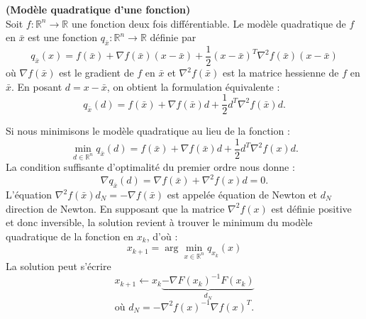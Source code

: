 \begin{frdefinition}\textbf {(Mod\`ele quadratique d'une fonction)} \\
Soit $f:\mathbb{R}^n\rightarrow \mathbb{R}$ une fonction deux fois diff\'erentiable. Le mod\`ele quadratique de $f$ en
$\bar{x}$ est une fonction $q_{\bar{x}}:\mathbb{R}^n\rightarrow \mathbb{R}$ d\'efinie par
$$q_{\bar{x}}(x)=f(\bar{x})+\nabla f(\bar{x})(x-\bar{x})+\frac{1}{2}(x-\bar{x})^T\nabla^2 f(\bar{x})(x-\bar{x})$$
o\`u $\nabla f(\bar{x})$ est le gradient de $f$ en $\bar{x}$ et $\nabla^2 f(\bar{x})$ est la matrice hessienne de
$f$ en $\bar{x}$. En posant $d=x-\bar{x}$, on obtient la formulation \'equivalente :
\begin{equation*}
q_{\bar{x}}(d)=f(\bar{x})+\nabla f(\bar{x})d+\frac{1}{2}d^T\nabla^2 f(\bar{x})d.
\end{equation*}
\end{frdefinition}
Si nous minimisons le mod\`ele quadratique au lieu de la fonction :
\begin{equation*}
\min_{d\in \mathbb{R}^n} q_{\bar{x}}(d)=f(\bar{x})+\nabla f(\bar{x})d+\frac{1}{2}d^T\nabla^2f(x)d.
\end{equation*}
%
La condition suffisante d'optimalit\'e du premier ordre nous donne :
\begin{equation*}
\nabla q_{\bar{x}}(d)=\nabla f(\bar{x})+\nabla^2f(x)d=0.
\end{equation*}
%
L'\'equation $\nabla^2 f(\bar{x})d_N=-\nabla f(\bar{x})$ est appel\'ee \'equation de Newton et $d_N$ direction de Newton.
En supposant que la matrice $\nabla^2f(x)$ est d\'efinie positive et donc inversible, la
solution revient \`a trouver le minimum du mod\`ele quadratique de la fonction en $x_k$, d'o\`u :
\begin{equation*}
x_{k+1}=\arg\min_{x\in\mathbb{R}^n} q_{x_k}(x)
\end{equation*}
La solution peut s'\'ecrire
\begin{equation*}
x_{k+1}\leftarrow x_k\underbrace{-\nabla F(x_k)^{-1}F(x_k)}_{d_N}
\end{equation*}
\begin{equation*}
\text{o\`u } d_N=-\nabla^2f(x)^{-1}\nabla f(x)^T.
\end{equation*}
